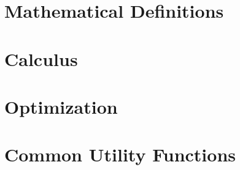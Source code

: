 \documentclass{article}
\begin{document}


\newpage
\appendix
\section{Mathematical Definitions}
\label{sec:math-defin}

 

\newpage

\section{Calculus}
\label{sec:calculus}



\newpage
\section{Optimization}
\label{sec:optimization}



\newpage

\section{Common Utility Functions}
\label{sec:comm-util-funct}


\end{document}
